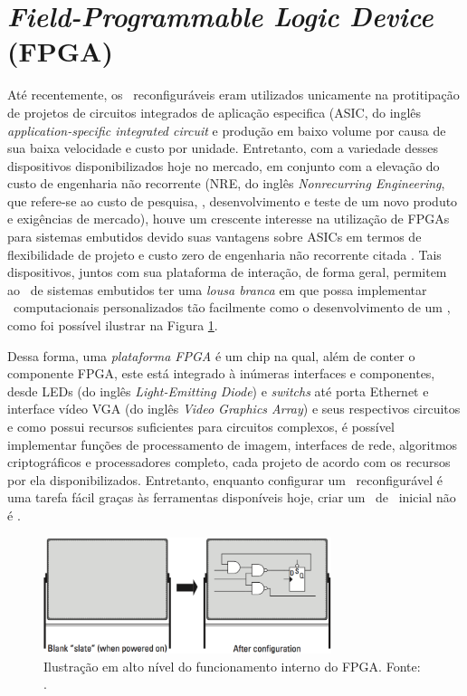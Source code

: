 \section{\textit{Field-Programmable Logic Device} (FPGA)}
	Até recentemente, os \hardwares\ reconfiguráveis eram utilizados unicamente na protitipação de projetos de circuitos integrados de aplicação especifica (ASIC, do inglês \textit{application-specific integrated circuit} e produção em baixo volume por causa de sua baixa velocidade e custo por unidade.
	Entretanto, com a variedade desses dispositivos disponibilizados hoje no mercado, em conjunto com a elevação do custo de engenharia não recorrente (NRE, do inglês \textit{Nonrecurring Engineering}, que refere-se ao custo de pesquisa, \design, desenvolvimento e teste de um novo produto e exigências de mercado), houve um crescente interesse na utilização de FPGAs para sistemas embutidos devido suas vantagens sobre ASICs em termos de flexibilidade de projeto e custo zero de engenharia não recorrente citada \citep{Mei2000}.
	Tais dispositivos, juntos com sua plataforma de interação, de forma geral, permitem ao \designer\ de sistemas embutidos ter uma \textit{lousa branca} em que possa implementar \hardwares\ computacionais personalizados tão facilmente como o desenvolvimento de um \software, como foi possível ilustrar na Figura \ref{fig:rt-board}.

	Dessa forma, uma \textit{plataforma FPGA} é um chip na qual, além de conter o componente FPGA, este está integrado à inúmeras interfaces e componentes, desde LEDs (do inglês \textit{Light-Emitting Diode}) e \textit{switchs} até porta Ethernet e interface vídeo VGA (do inglês \textit{Video Graphics Array}) e seus respectivos circuitos e como possui recursos suficientes para circuitos complexos, é possível implementar funções de processamento de imagem, interfaces de rede, algoritmos criptográficos e processadores completo, cada projeto de acordo com os recursos por ela disponibilizados. %
	Entretanto, enquanto configurar um \hardware\ reconfigurável é uma tarefa fácil graças às ferramentas disponíveis hoje, criar um \design\ de \hardware\ inicial não é \citep{Sass2010}.

	\begin{figure}[h] \centering
		\includegraphics[width=0.75\textwidth]{img/rt-board.png}
		\caption{Ilustração em alto nível do funcionamento interno do FPGA. Fonte: \cite{Sass2010}.}
		\label{fig:rt-board}
	\end{figure}


